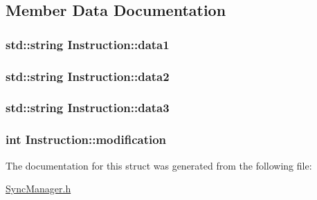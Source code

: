 \subsection{Member Data Documentation}
\hypertarget{structInstruction_ad7d1d4043e18a9423c7552a7e9ce9a12}{
\subsubsection[{data1}]{\setlength{\rightskip}{0pt plus 5cm}std\-::string Instruction\-::data1}}\label{structInstruction_ad7d1d4043e18a9423c7552a7e9ce9a12}
\hypertarget{structInstruction_a903d2f41be2643dadbf6035f8a15644d}{
\subsubsection[{data2}]{\setlength{\rightskip}{0pt plus 5cm}std\-::string Instruction\-::data2}}\label{structInstruction_a903d2f41be2643dadbf6035f8a15644d}
\hypertarget{structInstruction_a8abe197055a519475ed6af2567c44dc9}{
\subsubsection[{data3}]{\setlength{\rightskip}{0pt plus 5cm}std\-::string Instruction\-::data3}}\label{structInstruction_a8abe197055a519475ed6af2567c44dc9}
\hypertarget{structInstruction_a9f627f3906fb312ecea13411a28a686f}{
\subsubsection[{modification}]{\setlength{\rightskip}{0pt plus 5cm}int Instruction\-::modification}}\label{structInstruction_a9f627f3906fb312ecea13411a28a686f}


The documentation for this struct was generated from the following file\-:\begin{DoxyCompactItemize}
\item 
\hyperlink{SyncManager_8h}{Sync\-Manager.\-h}\end{DoxyCompactItemize}
